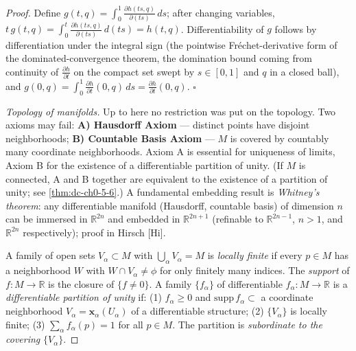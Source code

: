 \begin{proof}
  \leanok
  Define $g(t,q)=\int_0^1\frac{\partial h(ts,q)}{\partial(ts)}\,ds$; after
  changing variables, $t\,g(t,q)=\int_0^t\frac{\partial h(ts,q)}{\partial(ts)}\,d(ts)=h(t,q)$.
  Differentiability of $g$ follows by differentiation under the integral sign
  (the pointwise Fréchet-derivative form of the dominated-convergence theorem, the
  domination bound coming from continuity of $\frac{\partial h}{\partial t}$ on the
  compact set swept by $s\in[0,1]$ and $q$ in a closed ball), and
  $g(0,q)=\int_0^1\frac{\partial h}{\partial t}(0,q)\,ds=\frac{\partial h}{\partial t}(0,q)$.
  $\square$

  \emph{Topology of manifolds.} Up to here no restriction was put on the topology. Two
  axioms may fail: \textbf{A) Hausdorff Axiom} — distinct points have disjoint
  neighborhoods; \textbf{B) Countable Basis Axiom} — $M$ is covered by countably many
  coordinate neighborhoods. Axiom A is essential for uniqueness of limits, Axiom B
  for the existence of a differentiable partition of unity. (If $M$ is connected,
  A and B together are equivalent to the existence of a partition of unity; see
  \cref{thm:dc-ch0-5-6}.) A fundamental embedding result is \emph{Whitney's theorem}: any
  differentiable manifold (Hausdorff, countable basis) of dimension $n$ can be
  immersed in $\mathbb{R}^{2n}$ and embedded in $\mathbb{R}^{2n+1}$ (refinable to
  $\mathbb{R}^{2n-1}$, $n>1$, and $\mathbb{R}^{2n}$ respectively); proof in Hirsch
  [Hi].
  
  A family of open sets $V_\alpha\subset M$ with $\bigcup_\alpha V_\alpha=M$ is
  \emph{locally finite} if every $p\in M$ has a neighborhood $W$ with $W\cap V_\alpha\neq\phi$
  for only finitely many indices. The \emph{support} of $f:M\to\mathbb{R}$ is the
  closure of $\{f\neq0\}$. A family $\{f_\alpha\}$ of differentiable
  $f_\alpha:M\to\mathbb{R}$ is a \emph{differentiable partition of unity} if:
  (1) $f_\alpha\ge0$ and $\mathrm{supp}\,f_\alpha\subset$ a coordinate neighborhood
  $V_\alpha=\mathbf{x}_\alpha(U_\alpha)$ of a differentiable structure;
  (2) $\{V_\alpha\}$ is locally finite;
  (3) $\sum_\alpha f_\alpha(p)=1$ for all $p\in M$.
  The partition is \emph{subordinate to the covering} $\{V_\alpha\}$.
\end{proof}

